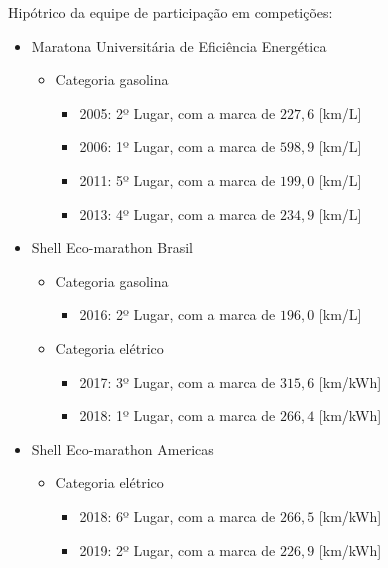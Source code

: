 Hipótrico da equipe de participação em competições:
\begin{itemize}
    \item Maratona Universitária de Eficiência Energética
        \begin{itemize}
            \item  Categoria gasolina
            \begin{itemize}
                \item 2005: 2º Lugar, com a marca de $227,6$ [km/L]
                \item 2006: 1º Lugar, com a marca de $598,9$ [km/L]
                \item 2011: 5º Lugar, com a marca de $199,0$ [km/L]
                \item 2013: 4º Lugar, com a marca de $234,9$ [km/L] 
            \end{itemize}
        \end{itemize}
    \item Shell Eco-marathon Brasil
        \begin{itemize}
            \item  Categoria gasolina
            \begin{itemize}
                \item 2016: 2º Lugar, com a marca de $196,0$ [km/L] 
            \end{itemize}
            \item  Categoria elétrico
            \begin{itemize}
                \item 2017: 3º Lugar, com a marca de $315,6$ [km/kWh]
                \item 2018: 1º Lugar, com a marca de $266,4$ [km/kWh]
            \end{itemize}
        \end{itemize}
    \item Shell Eco-marathon Americas
        \begin{itemize}
            \item  Categoria elétrico
            \begin{itemize}
                \item 2018: 6º Lugar, com a marca de $266,5$ [km/kWh]
                \item 2019: 2º Lugar, com a marca de $226,9$ [km/kWh]
            \end{itemize}
        \end{itemize}
\end{itemize}

